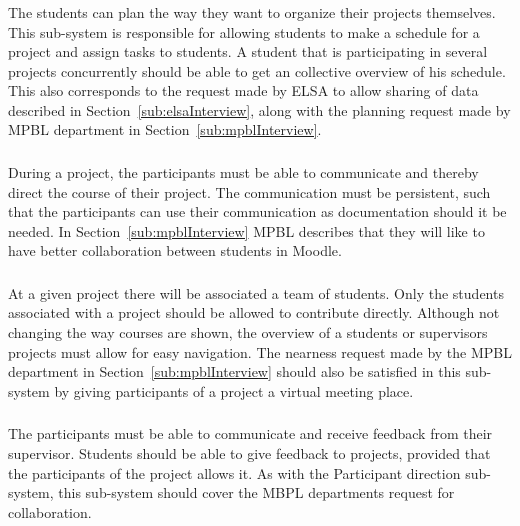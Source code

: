 \subsubsection{\timelinegroup{}} %
The students can plan the way they want to organize their projects themselves.
This sub-system is responsible for allowing students to make a schedule for a project and assign tasks to students.
A student that is participating in several projects concurrently should be able to get an collective overview of his schedule.
This also corresponds to the request made by ELSA to allow sharing of data described in Section~\ref{sub:elsaInterview}, along with the planning request made by MPBL department in Section~\ref{sub:mpblInterview}.

\subsubsection{\blackboardgroup{}} %
During a project, the participants must be able to communicate and thereby direct the course of their project.
The communication must be persistent, such that the participants can use their communication as documentation should it be needed.
In Section~\ref{sub:mpblInterview} MPBL describes that they will like to have better collaboration between students in Moodle.

\subsubsection{\administrationgroup{}} %
At a given project there will be associated a team of students.
Only the students associated with a project should be allowed to contribute directly.
Although not changing the way courses are shown, the overview of a students or supervisors projects must allow for easy navigation.
The nearness request made by the MPBL department in Section~\ref{sub:mpblInterview} should also be satisfied in this sub-system by giving participants of a project a virtual meeting place.

\subsubsection{\supervisorgroup{}} %
The participants must be able to communicate and receive feedback from their supervisor.
Students should be able to give feedback to projects, provided that the participants of the project allows it.
As with the Participant direction sub-system, this sub-system should cover the MBPL departments request for collaboration.


